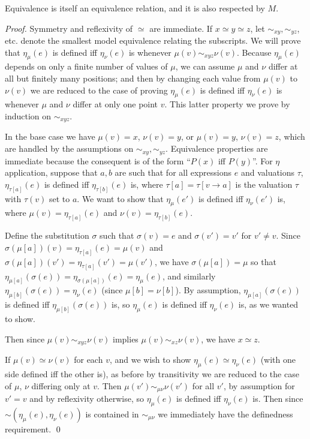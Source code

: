 \documentclass[runningheads,a4paper]{llncs}
\begin{document}
\begin{theorem}\label{thm:equiv}
Equivalence is itself an equivalence relation, and it is also respected by $M$.
\end{theorem}
\begin{proof}
Symmetry and reflexivity of $\simeq$ are immediate. If $x\simeq y\simeq z$, let $\sim_{xy},\sim_{yz}$, etc. denote the smallest model equivalence relating the subscripts. We will prove that $\eta_\mu(e)$ is defined iff $\eta_\nu(e)$ is whenever $\mu(v)\sim_{xyz}\nu(v)$. Because $\eta_\mu(e)$ depends on only a finite number of values of $\mu$, we can assume $\mu$ and $\nu$ differ at all but finitely many positions; and then by changing each value from $\mu(v)$ to $\nu(v)$ we are reduced to the case of proving $\eta_\mu(e)$ is defined iff $\eta_\nu(e)$ is whenever $\mu$ and $\nu$ differ at only one point $v$. This latter property we prove by induction on $\sim_{xyz}$.

In the base case we have $\mu(v)=x$, $\nu(v)=y$, or $\mu(v)=y$, $\nu(v)=z$, which are handled by the assumptions on $\sim_{xy},\sim_{yz}$. Equivalence properties are immediate because the consequent is of the form ``$P(x)$ iff $P(y)$''. For $\eta$ application, suppose that $a,b$ are such that for all expressions $e$ and valuations $\tau$, $\eta_{\tau[a]}(e)$ is defined iff $\eta_{\tau[b]}(e)$ is, where $\tau[a]=\tau[v\to a]$ is the valuation $\tau$ with $\tau(v)$ set to $a$. We want to show that $\eta_\mu(e')$ is defined iff $\eta_\nu(e')$ is, where $\mu(v)=\eta_{\tau[a]}(e)$ and $\nu(v)=\eta_{\tau[b]}(e)$.

Define the substitution $\sigma$ such that $\sigma(v)=e$ and $\sigma(v')=v'$ for $v'\ne v$. Since $\sigma(\mu[a])(v)=\eta_{\tau[a]}(e)=\mu(v)$ and $\sigma(\mu[a])(v')=\eta_{\tau[a]}(v')=\mu(v')$, we have $\sigma(\mu[a])=\mu$ so that $\eta_{\mu[a]}(\sigma(e))=\eta_{\sigma(\mu[a])}(e)=\eta_\mu(e)$, and similarly $\eta_{\mu[b]}(\sigma(e))=\eta_\nu(e)$ (since $\mu[b]=\nu[b]$). By assumption, $\eta_{\mu[a]}(\sigma(e))$ is defined iff $\eta_{\mu[b]}(\sigma(e))$ is, so $\eta_\mu(e)$ is defined iff $\eta_\nu(e)$ is, as we wanted to show.

Then since $\mu(v)\sim_{xyz}\nu(v)$ implies $\mu(v)\sim_{xz}\nu(v)$, we have $x\simeq z$.

If $\mu(v)\simeq\nu(v)$ for each $v$, and we wish to show $\eta_\mu(e)\simeq\eta_\nu(e)$ (with one side defined iff the other is), as before by transitivity we are reduced to the case of $\mu$, $\nu$ differing only at $v$. Then $\mu(v')\sim_{\mu\nu}\nu(v')$ for all $v'$, by assumption for $v'=v$ and by reflexivity otherwise, so $\eta_\mu(e)$ is defined iff $\eta_\nu(e)$ is. Then since $\sim(\eta_\mu(e),\eta_\nu(e))$ is contained in $\sim_{\mu\nu}$ we immediately have the definedness requirement.
\qed\end{proof}
\end{document}
